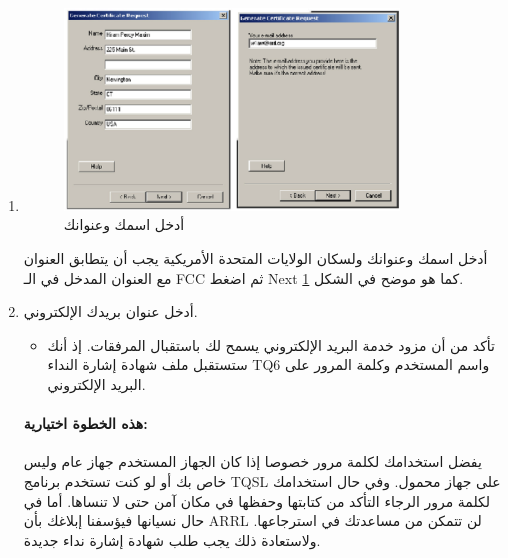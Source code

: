 \documentclass[a4paper,12pt]{article}
\begin{document}
\begin{enumerate}
\begin{itemize}
				\end{itemize}
			\item
				\begin{figure}[!hbtp]
				\centering
				\includegraphics[width=0.84\textwidth]{csrname.eps}
				\caption{أدخل اسمك وعنوانك}
				\label{fig:CSR Name}
				\end{figure}
				أدخل اسمك وعنوانك ولسكان الولايات المتحدة الأمريكية يجب أن يتطابق العنوان مع العنوان المدخل في الـ \textenglish{FCC} ثم اضغط \textenglish{Next} كما هو موضح في الشكل \ref{fig:CSR Name}.

			\item
				أدخل عنوان بريدك الإلكتروني.
				\begin{itemize}
					\item
						تأكد من أن مزود خدمة البريد الإلكتروني يسمح لك باستقبال المرفقات. إذ أنك ستستقبل ملف شهادة إشارة النداء \textenglish{TQ6} واسم المستخدم وكلمة المرور على البريد الإلكتروني.
				\end{itemize}
				

\paragraph{هذه الخطوة اختيارية:}
يفضل استخدامك لكلمة مرور خصوصا إذا كان الجهاز المستخدم جهاز عام وليس خاص
بك أو لو كنت تستخدم برنامج \textenglish{TQSL} على جهاز محمول. وفي حال استخدامك لكلمة
مرور الرجاء التأكد من كتابتها وحفظها في مكان آمن حتى لا تنساها. أما في
حال نسيانها فيؤسفنا إبلاغك بأن \textenglish{ARRL} لن تتمكن من مساعدتك في استرجاعها.
ولاستعادة ذلك يجب طلب شهادة إشارة نداء جديدة.


\end{enumerate}
\end{document}
